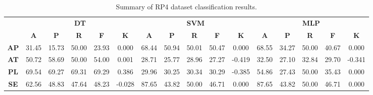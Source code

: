\begin{landscape}
\begin{table}[htbp]
\footnotesize
\centering
\caption{Summary of RP4 dataset classification results.}
\label{tab:base_female}
\begin{tabular}{|c|c|c|c|c|c|c|c|c|c|c|c|c|c|c|c|}
\hline
\multirow{2}{*}{}	& \multicolumn{5}{c|}{\textbf{DT}}												& \multicolumn{5}{c|}{\textbf{SVM}}												& \multicolumn{5}{c|}{\textbf{MLP}}												\\ \cline{2-16} 
					& \textbf{A}	& \textbf{P}	& \textbf{R}	& \textbf{F}	& \textbf{K}	& \textbf{A}	& \textbf{P}	& \textbf{R}	& \textbf{F}	& \textbf{K}	& \textbf{A}	& \textbf{P}	& \textbf{R}	& \textbf{F}	& \textbf{K}	\\ \hline
\textbf{AP}			& 31.45			& 15.73			& 50.00			& 23.93			& 0.000			& 68.44			& 50.94			& 50.01			& 50.47			& 0.000			& 68.55			& 34.27			& 50.00			& 40.67			& 0.000			\\ \hline
\textbf{AT}			& 50.72			& 58.69			& 50.00			& 54.00			& 0.001			& 28.71			& 25.77			& 28.96			& 27.27			& -0.419			& 32.50			& 27.10			& 32.84			& 29.70			& -0.341			\\ \hline
\textbf{PL}			& 69.54			& 69.27			& 69.31			& 69.29			& 0.386			& 29.96			& 30.25			& 30.34			& 30.29			& -0.385			& 54.86			& 27.43			& 50.00			& 35.43			& 0.000			\\ \hline
\textbf{SE}			& 62.56			& 48.83			& 47.64			& 48.23			& -0.028			& 87.65			& 43.82			& 50.00			& 46.71			& 0.000			& 87.65			& 43.82			& 50.00			& 46.71			& 0.000			\\ \hline
\end{tabular}
\end{table}
\end{landscape}